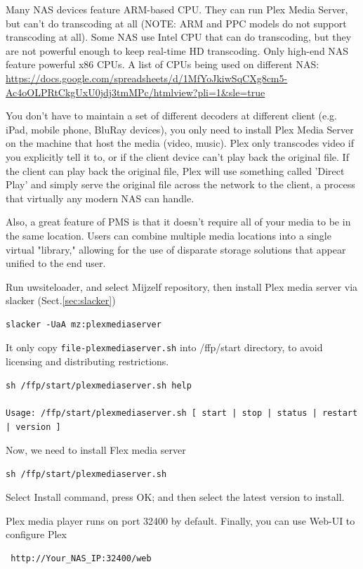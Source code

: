 Many NAS devices feature ARM-based CPU. They can run Plex Media Server, but
can't do transcoding at all (NOTE:  ARM and PPC models do not support
transcoding at all).  Some NAS use Intel CPU that can do transcoding, but they
are not powerful enough to keep real-time HD transcoding. Only high-end NAS
feature powerful x86 CPUs.
A list of CPUs being used on different NAS:
\url{https://docs.google.com/spreadsheets/d/1MfYoJkiwSqCXg8cm5-Ac4oOLPRtCkgUxU0jdj3tmMPc/htmlview?pli=1&sle=true}

You don't have to maintain a set of different decoders at different client
(e.g. iPad, mobile phone, BluRay devices), you only need to install Plex Media
Server on the machine that host the media (video, music).
 Plex only transcodes video if you
explicitly tell it to, or if the client device can't play back the original file. If the client can play back the original
file, Plex will use something called 'Direct Play' and simply serve the original
file across the network to the client, a process that virtually any modern NAS
can handle.

Also, a great feature of PMS is that it doesn't require all of your media to be
in the same location.
Users can combine multiple media locations into a single virtual "library,"
allowing for the use of disparate storage solutions that appear unified to the
end user.

Run uwsiteloader, and select Mijzelf  repository, then install Plex media server
via slacker (Sect.\ref{sec:slacker})
\begin{verbatim}
slacker -UaA mz:plexmediaserver
\end{verbatim}

It only copy \verb!file-plexmediaserver.sh! into /ffp/start directory, to avoid
licensing and distributing restrictions.
\begin{verbatim}
sh /ffp/start/plexmediaserver.sh help

Usage: /ffp/start/plexmediaserver.sh [ start | stop | status | restart | version ]
\end{verbatim}

Now, we need to install Flex media server
\begin{verbatim}
sh /ffp/start/plexmediaserver.sh
\end{verbatim}
Select Install command, press OK; and then 
select the latest version to install.   

Plex media player runs on port 32400 by default.
Finally, you can use Web-UI to configure Plex
\begin{verbatim}
 http://Your_NAS_IP:32400/web
\end{verbatim}


